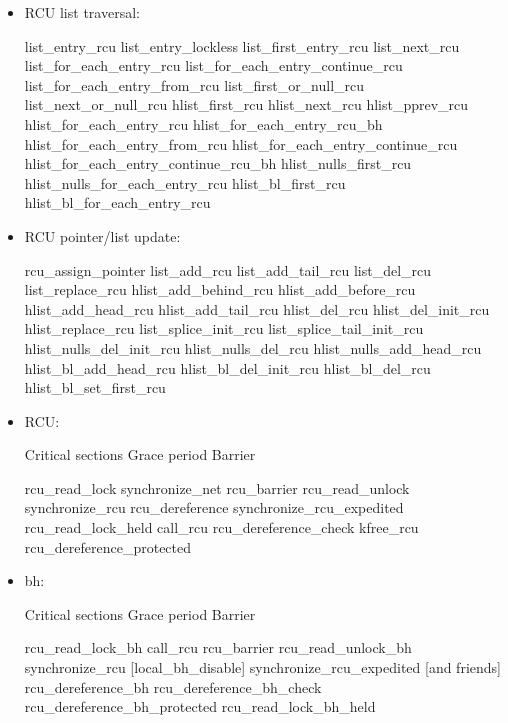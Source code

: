 \begin{itemize}
\item RCU list traversal:

\begin{VerbatimU}[samepage=false]
	list_entry_rcu
	list_entry_lockless
	list_first_entry_rcu
	list_next_rcu
	list_for_each_entry_rcu
	list_for_each_entry_continue_rcu
	list_for_each_entry_from_rcu
	list_first_or_null_rcu
	list_next_or_null_rcu
	hlist_first_rcu
	hlist_next_rcu
	hlist_pprev_rcu
	hlist_for_each_entry_rcu
	hlist_for_each_entry_rcu_bh
	hlist_for_each_entry_from_rcu
	hlist_for_each_entry_continue_rcu
	hlist_for_each_entry_continue_rcu_bh
	hlist_nulls_first_rcu
	hlist_nulls_for_each_entry_rcu
	hlist_bl_first_rcu
	hlist_bl_for_each_entry_rcu
\end{VerbatimU}

\item RCU pointer/list update:

\begin{VerbatimU}[samepage=false]
	rcu_assign_pointer
	list_add_rcu
	list_add_tail_rcu
	list_del_rcu
	list_replace_rcu
	hlist_add_behind_rcu
	hlist_add_before_rcu
	hlist_add_head_rcu
	hlist_add_tail_rcu
	hlist_del_rcu
	hlist_del_init_rcu
	hlist_replace_rcu
	list_splice_init_rcu
	list_splice_tail_init_rcu
	hlist_nulls_del_init_rcu
	hlist_nulls_del_rcu
	hlist_nulls_add_head_rcu
	hlist_bl_add_head_rcu
	hlist_bl_del_init_rcu
	hlist_bl_del_rcu
	hlist_bl_set_first_rcu
\end{VerbatimU}

\item RCU\@:

\begin{VerbatimU}[tabsize=1]
	Critical sections       Grace period            Barrier

	rcu_read_lock           synchronize_net         rcu_barrier
	rcu_read_unlock         synchronize_rcu
	rcu_dereference         synchronize_rcu_expedited
	rcu_read_lock_held      call_rcu
	rcu_dereference_check   kfree_rcu
	rcu_dereference_protected
\end{VerbatimU}

\item bh:

\begin{VerbatimU}[tabsize=1]
	Critical sections       Grace period            Barrier

	rcu_read_lock_bh        call_rcu                rcu_barrier
	rcu_read_unlock_bh      synchronize_rcu
	[local_bh_disable]      synchronize_rcu_expedited
	[and friends]
	rcu_dereference_bh
	rcu_dereference_bh_check
	rcu_dereference_bh_protected
	rcu_read_lock_bh_held
\end{VerbatimU}


\end{itemize}
